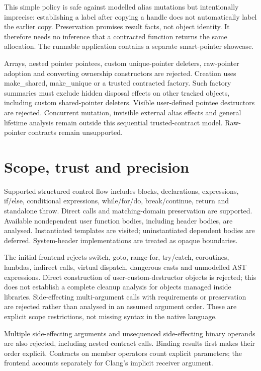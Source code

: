 \documentclass[11pt]{article}
\begin{document}
This simple policy is safe against modelled alias mutations but intentionally
imprecise: establishing a label after copying a handle does not automatically
label the earlier copy. Preservation promises result facts, not object identity.
It therefore needs no inference that a contracted function returns the same
allocation. The runnable application contains a separate smart-pointer showcase.

Arrays, nested pointer pointees, custom unique-pointer deleters, raw-pointer
adoption and converting ownership constructors are rejected. Creation uses
make\_shared, make\_unique or a trusted contracted factory. Such factory summaries
must exclude hidden disposal effects on other tracked objects, including custom
shared-pointer deleters. Visible user-defined pointee destructors are rejected.
Concurrent mutation, invisible external alias effects and general lifetime
analysis remain outside this sequential trusted-contract model. Raw-pointer
contracts remain unsupported.

\section{Scope, trust and precision}
Supported structured control flow includes blocks, declarations, expressions,
if/else, conditional expressions, while/for/do, break/continue, return and
standalone throw. Direct calls and matching-domain preservation are supported.
Available nondependent user function bodies, including header bodies, are
analysed. Instantiated templates are visited; uninstantiated dependent bodies
are deferred. System-header implementations are treated as opaque boundaries.

The initial frontend rejects switch, goto, range-for, try/catch, coroutines,
lambdas, indirect calls, virtual dispatch, dangerous casts and unmodelled AST
expressions. Direct construction of user-custom-destructor objects is rejected;
this does not establish a complete cleanup analysis for objects managed inside
libraries. Side-effecting multi-argument calls with requirements or preservation
are rejected rather than analysed in an assumed argument order. These are
explicit scope restrictions, not missing syntax in the native language.

Multiple side-effecting arguments and unsequenced side-effecting binary operands
are also rejected, including nested contract calls. Binding results first makes
their order explicit. Contracts on member operators count explicit parameters;
the frontend accounts separately for Clang's implicit receiver argument.
\end{document}
